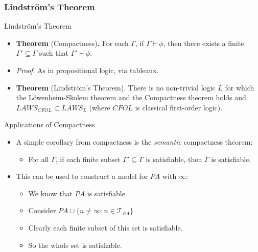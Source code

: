 \subsubsection{Lindstr\"om's Theorem}
\begin{frame}{Lindstr\"om's Theorem}

  \begin{itemize}

  \item \textbf{Theorem} (Compactness)\textbf{.} For each $\Gamma$, if
    $\Gamma\vdash\phi$, then there exists a finite
    $\Gamma'\subseteq\Gamma$ such that $\Gamma'\vdash\phi$.

  \item \emph{Proof}. As in propositional logic, via tableaux.

   \item \textbf{Theorem} (Lindstr\"om's Theorem). There is no
     non-trivial logic $L$ for which the L\"owenheim-Skolem theorem
     and the Compactness theorem holds and $LAWS_{CFOL}\subset
     LAWS_L$ (where $CFOL$ is classical first-order logic).
    
  \end{itemize}
  
\end{frame}

\begin{frame}{Applications of Compactness}

  \begin{itemize}
  \item A simple corollary from compactness is the \emph{semantic}
    compactness theorem:
    \begin{itemize}
    \item For all $\Gamma$, if each finite subset
      $\Gamma'\subseteq\Gamma$ is satisfiable, then $\Gamma$ is satisfiable.
    \end{itemize}

    \item This can be used to construct a model for $PA$ with
      $\infty$:

      \begin{itemize}
      \item We know that $PA$ is satisfiable.
      \item Consider $PA\cup\{n\neq \infty:n\in\mathcal{T}_{PA}\}$
      \item Clearly each finite subset of this set is satisfiable.
      \item So the whole set is satisfiable.
        
      \end{itemize}
  \end{itemize}
  
\end{frame}

